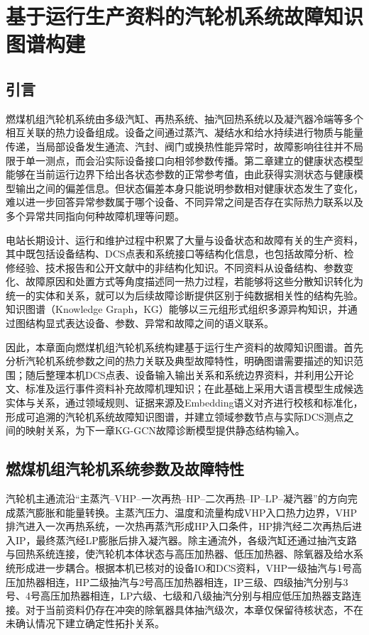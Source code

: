 \section{基于运行生产资料的汽轮机系统故障知识图谱构建}
\label{sec:knowledge_graph_v5}

\subsection{引言}

燃煤机组汽轮机系统由多级汽缸、再热系统、抽汽回热系统以及凝汽器冷端等多个相互关联的热力设备组成。设备之间通过蒸汽、凝结水和给水持续进行物质与能量传递，当局部设备发生通流、汽封、阀门或换热性能异常时，故障影响往往并不局限于单一测点，而会沿实际设备接口向相邻参数传播。第二章建立的健康状态模型能够在当前运行边界下给出各状态参数的正常参考值，由此获得实测状态与健康模型输出之间的偏差信息。但状态偏差本身只能说明参数相对健康状态发生了变化，难以进一步回答异常参数属于哪个设备、不同异常之间是否存在实际热力联系以及多个异常共同指向何种故障机理等问题。

电站长期设计、运行和维护过程中积累了大量与设备状态和故障有关的生产资料，其中既包括设备结构、DCS点表和系统接口等结构化信息，也包括故障分析、检修经验、技术报告和公开文献中的非结构化知识。不同资料从设备结构、参数变化、故障原因和处置方式等角度描述同一热力过程，若能够将这些分散知识转化为统一的实体和关系，就可以为后续故障诊断提供区别于纯数据相关性的结构先验。知识图谱（Knowledge Graph，KG）能够以三元组形式组织多源异构知识，并通过图结构显式表达设备、参数、异常和故障之间的语义联系\cite{Hogan2021KnowledgeGraphs}。

因此，本章面向燃煤机组汽轮机系统构建基于运行生产资料的故障知识图谱。首先分析汽轮机系统参数之间的热力关联及典型故障特性，明确图谱需要描述的知识范围；随后整理本机DCS点表、设备输入输出关系和系统边界资料，并利用公开论文、标准及运行事件资料补充故障机理知识；在此基础上采用大语言模型生成候选实体与关系，通过领域规则、证据来源及Embedding语义对齐进行校核和标准化，形成可追溯的汽轮机系统故障知识图谱，并建立领域参数节点与实际DCS测点之间的映射关系，为下一章KG-GCN故障诊断模型提供静态结构输入。

\subsection{燃煤机组汽轮机系统参数及故障特性}
\label{subsec:turbine_fault_characteristics_v5}

汽轮机主通流沿“主蒸汽--VHP--一次再热--HP--二次再热--IP--LP--凝汽器”的方向完成蒸汽膨胀和能量转换。主蒸汽压力、温度和流量构成VHP入口热力边界，VHP排汽进入一次再热系统，一次热再蒸汽形成HP入口条件，HP排汽经二次再热后进入IP，最终蒸汽经LP膨胀后排入凝汽器。除主通流外，各级汽缸还通过抽汽支路与回热系统连接，使汽轮机本体状态与高压加热器、低压加热器、除氧器及给水系统形成进一步耦合。根据本机已核对的设备IO和DCS资料，VHP一级抽汽与1号高压加热器相连，HP二级抽汽与2号高压加热器相连，IP三级、四级抽汽分别与3号、4号高压加热器相连，LP六级、七级和八级抽汽分别与相应低压加热器支路连接。对于当前资料仍存在冲突的除氧器具体抽汽级次，本章仅保留待核状态，不在未确认情况下建立确定性拓扑关系。

